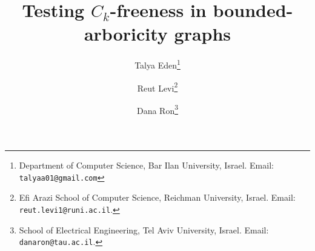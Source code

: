 \documentclass{article}
\begin{document}
\title{Testing $C_k$-freeness in bounded-arboricity graphs}
	\author{
	Talya Eden\thanks{Department of Computer Science, Bar Ilan University, Israel. Email: {\tt talyaa01@gmail.com}}
		\and
		Reut Levi\thanks{Efi Arazi School of Computer Science,  Reichman University, Israel. Email: {\tt reut.levi1@runi.ac.il}.}
			\and
		Dana Ron\thanks{School of Electrical Engineering, Tel Aviv University, Israel. Email: {\tt danaron@tau.ac.il}.}
}


\maketitle



\date{}
			
				
\end{document}
